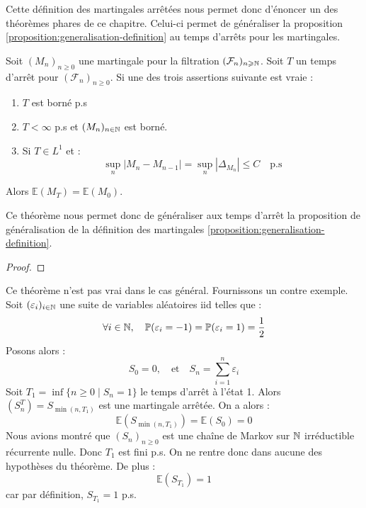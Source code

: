 Cette définition des martingales arrêtées nous permet donc d'énoncer un des théorèmes phares de ce chapitre. 
Celui-ci permet de généraliser la proposition \ref{proposition:generalisation-definition} au temps d'arrêts 
pour les martingales. 

\begin{theorem}\label{theorem:stop-doob-theorem}
    Soit $(M_n)_{n \geqslant 0}$ une martingale pour la filtration $( \mathcal{F}_n)_{n \geqslant \mathbb{N}}$.
    Soit $T$ un temps d'arrêt pour $( \mathcal{F}_n)_{n \geqslant 0}$. 
    Si une des trois assertions suivante est vraie : 
    \begin{enumerate}[label=\roman*)]
        \item $T$ est borné p.s 
        \item $ T < \infty$ p.s et $(M_n)_{n \in \mathbb{N}}$ est borné. 
        \item Si $T \in L^1$ et : 
            \begin{equation}\label{eq:third-stop-condition}
                \sup_n \left| M_n - M_{n-1 }\right| = \sup_n \left| \Delta_{M_n}\right| \leqslant C \quad \text{p.s}  
            \end{equation}
    \end{enumerate}
    Alors $\boxed{ \mathbb{E}(M_T) = \mathbb{E}(M_0)}$.
\end{theorem}

Ce théorème nous permet donc de généraliser aux temps d'arrêt la proposition de généralisation de la 
définition des martingales \ref{proposition:generalisation-definition}.

\begin{proof}
    
\end{proof}


\begin{remark}[Limites]
    Ce théorème n'est pas vrai dans le cas général. Fournissons
    un contre exemple. Soit $( \varepsilon_i)_{i \in \mathbb{N}}$ une suite de variables 
    aléatoires iid telles que : 
        $$ \forall i \in \mathbb{N}, \quad \mathbb{P}( \varepsilon_i = -1) = \mathbb{P}( \varepsilon_i = 1) = \frac{1}{2} $$ 
    Posons alors : 
    $$ S_0 = 0, \quad \text{et} \quad S_n = \sum_{i=1}^{n} \varepsilon_i $$ 
    Soit $T_1 = \inf \{n \geqslant 0 \mid S_n = 1\}$ le temps d'arrêt 
    à l'état 1. Alors $(S_n^T) = S_{\min(n, T_1)}$ est une martingale arrêtée. 
    On a alors : 
        $$ \mathbb{E}(S_{\min(n,T_1)}) = \mathbb{E}(S_0) = 0 $$ 
    Nous avions montré que $(S_n)_{n \geqslant 0}$ est une chaîne de Markov 
    sur $\mathbb{N}$ irréductible récurrente nulle. Donc $T_1$ est fini p.s. 
    On ne rentre donc dans aucune des hypothèses du théorème. De plus : 
        $$ \mathbb{E}(S_{T_1}) = 1 $$ 
    car par définition, $S_{T_1} = 1$ p.s.
\end{remark}

